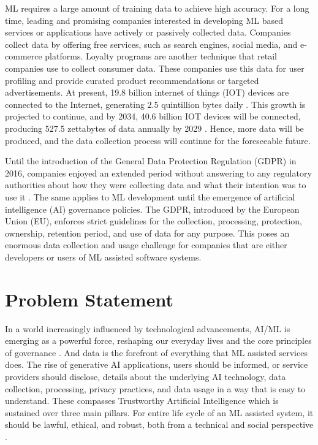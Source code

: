 \documentclass[manuscript,review,anonymous]{acmart}
\begin{document}
	ML requires a large amount of training data to achieve high accuracy. For a long time, leading and promising companies interested in developing ML based services or applications have actively or passively collected data. Companies collect data by offering free services, such as search engines, social media, and e-commerce platforms. Loyalty programs are another technique that retail companies use to collect consumer data. These companies use this data for user profiling and provide curated product recommendations or targeted advertisements. At present, 19.8 billion internet of things (IOT) devices are connected to the Internet, generating 2.5 quintillion bytes daily \cite{statistica_2, seedscientific}. This growth is projected to continue, and by 2034, 40.6 billion IOT devices will be connected, producing 527.5 zettabytes of data annually by 2029 \cite{statistica_1} \cite{statistica_2}. Hence, more data will be produced, and the data collection process will continue for the foreseeable future.

	Until the introduction of the General Data Protection Regulation (GDPR) in 2016, companies enjoyed an extended period without answering to any regulatory authorities about how they were collecting data and what their intention was to use it \cite{GDPR2016a}. The same applies to ML development until the emergence of artificial intelligence (AI) governance policies. The GDPR, introduced by the European Union (EU), enforces strict guidelines for the collection, processing, protection, ownership, retention period, and use of data for any purpose. This poses an enormous data collection and usage challenge for companies that are either developers or users of ML assisted software systems.

\section{Problem Statement}\label{probstat}

	In a world increasingly influenced by technological advancements, AI/ML is emerging as a powerful force, reshaping our everyday lives and the core principles of governance \cite{Filgueiras_2026}. And data is the forefront of everything that ML assisted services does. The rise of generative AI applications, users should be informed, or service providers should disclose, details about the underlying AI technology, data collection, processing, privacy practices, and data usage in a way that is easy to understand. These compasses Trustworthy Artificial Intelligence which is sustained over three main pillars. For entire life cycle of an ML assisted system, it should be lawful, ethical, and robust, both from a technical and social perspective \cite{10.1016/j.inffus.2023.101896}.
	
\end{document}
